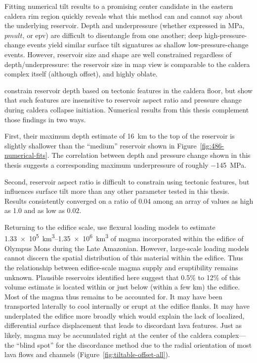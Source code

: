 Fitting numerical tilt results to a promising center candidate in the eastern caldera rim region quickly reveals what this method can and cannot say about the underlying reservoir. Depth and underpressure (whether expressed in \unit{\mega\Pa}, $pmult$, or \acs{epv}) are difficult to disentangle from one another; deep high-pressure-change events yield similar surface tilt signatures as shallow low-pressure-change events. However, reservoir size and shape are well constrained regardless of depth/underpressure: the reservoir size in map view is comparable to the caldera complex itself (although offset), and highly oblate.

\textcite{zuber_caldera_1992} constrain reservoir depth based on tectonic features in the caldera floor, but show that such features are insensitive to reservoir aspect ratio and pressure change during caldera collapse initiation. Numerical results from this thesis complement those findings in two ways. 

First, their maximum depth estimate of \qty{16}{\km} to the top of the reservoir is slightly shallower than the ``medium'' reservoir shown in Figure~\ref{fig:486-numerical-fits}. The correlation between depth and pressure change shown in this thesis suggests a corresponding maximum underpressure of roughly \qty{-145}{\mega\Pa}.  

Second, reservoir aspect ratio is difficult to constrain using tectonic features, but influences surface tilt more than any other parameter tested in this thesis. Results consistently converged on a ratio of 0.04 among an array of values as high as 1.0 and as low as 0.02. 

Returning to the edifice scale, \textcite{chadwick_late_2015} use flexural loading models to estimate \qtyrange{1.33e5}{1.35e6}{\km\cubed} of magma incorporated within the edifice of Olympus Mons during the Late Amazonian. However, large-scale loading models cannot discern the spatial distribution of this material within the edifice. Thus the relationship between edifice-scale magma supply and eruptibility remains unknown. Plausible reservoirs identified here suggest that 0.5\% to 12\% of this volume estimate is located within or just below (within a few km) the edifice. Most of the magma thus remains to be accounted for. It may have been transported laterally to cool internally or erupt at the edifice flanks. It may have underplated the edifice more broadly which would explain the lack of localized, differential surface displacement that leads to discordant lava features. Just as likely, magma may be accumulated right at the center of the caldera complex---the ``blind spot'' for the discordance method due to the radial orientation of most lava flows and channels (Figure~\ref{fig:tiltable-offset-all}).

